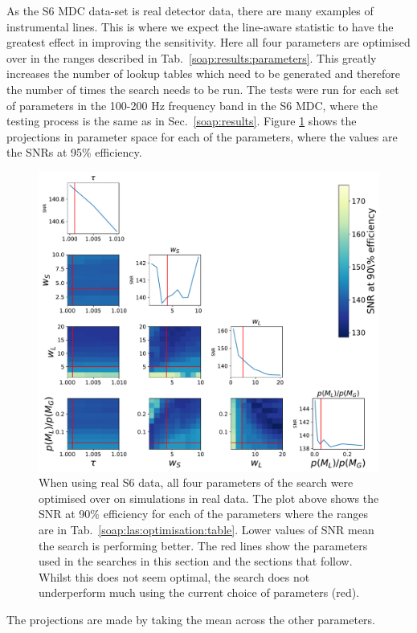 As the S6 \gls{MDC} data-set is real detector data, there are many examples of instrumental lines. 
This is where we expect the line-aware statistic to have the greatest effect in improving the sensitivity. 
Here all four parameters are optimised over in the ranges described in Tab.~\ref{soap:results:parameters}. 
This greatly increases the number of lookup tables which need to be generated and therefore the number of times the search needs to be run.
The tests were run for each set of parameters in the 100-200 Hz frequency band in the S6 \gls{MDC}, where the testing process is the same as in Sec.~\ref{soap:results}.
Figure \ref{soap:las:optimisation:s6mdcplot} shows the projections in parameter space for each of the parameters, where the values are the \glspl{SNR} at 95\% efficiency.  
%
%
\begin{figure}[p]
    \centering
    \includegraphics[width=\linewidth]{C3_soap/s6_optimised.pdf}
    \caption[Optimisation of line aware statistic in real S6 data.]{When using real S6 data, all four parameters of the search were optimised over on simulations in real data. The plot above shows the \gls{SNR} at 90\% efficiency for each of the parameters where the ranges are in Tab.~\ref{soap:las:optimisation:table}. Lower values of \gls{SNR} mean the search is performing better. The red lines show the parameters used in the searches in this section and the sections that follow. Whilst this does not seem optimal, the search does not underperform much using the current choice of parameters (red). }
    \label{soap:las:optimisation:s6mdcplot}
\end{figure}
%
%
The projections are made by taking the mean across the other parameters.

